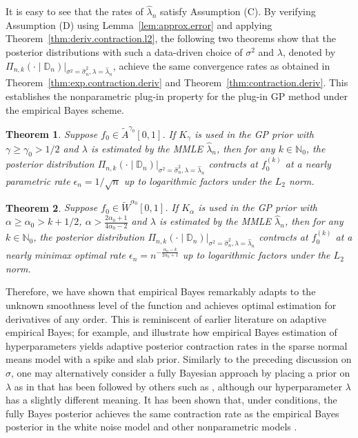 \documentclass[12pt]{article}
\newcommand\data{\mathbb{D}_n}
\theoremstyle{plain}
\newtheorem{theorem}{Theorem}
\theoremstyle{nonitalicremark}
\begin{document}
It is easy to see that the rates of $\hat\lambda_n$ satisfy Assumption (C). By verifying Assumption (D) using Lemma~\ref{lem:approx.error} and applying Theorem~\ref{thm:deriv.contraction.l2}, the following two theorems show that the posterior distributions with such a data-driven choice of $\sigma^2$ and $\lambda$, denoted by $\Pi_{n,k} (\cdot\mid\data)|_{\sigma^2 = \hat \sigma^2_n, \lambda = \hat\lambda_n}$, achieve the same convergence rates as obtained in Theorem~\ref{thm:exp.contraction.deriv} and Theorem~\ref{thm:contraction.deriv}. This establishes the nonparametric plug-in property for the plug-in GP method under the empirical Bayes scheme. 





\begin{theorem}\label{thm:adaptive.exp}
Suppose $f_0\in \widetilde{A}^{\gamma_0}[0,1]$. If $K_\gamma$ is used in the GP prior with $\gamma\geq\gamma_0>1/2$ and $\lambda$ is estimated by the MMLE $\hat\lambda_n$, then for any $k\in\mathbb{N}_0$, the posterior distribution $\Pi_{n,k} (\cdot\mid\data)|_{\sigma^2 = \hat \sigma^2_n, \lambda = \hat\lambda_n}$ contracts at $f_0^{(k)}$ at a nearly parametric rate $\epsilon_n = 1/\sqrt{n}$ up to logarithmic factors under the $L_2$ norm.
\end{theorem}

\begin{theorem}\label{thm:adaptive.poly}
Suppose $f_0 \in \widetilde{W}^{\alpha_0}[0,1]$. If $K_\alpha$ is used in the GP prior with $\alpha \geq \alpha_0 > k+1/2$, $\alpha > \frac{2\alpha_0+1}{4\alpha_0-2}$ and $\lambda$ is estimated by the MMLE $\hat\lambda_n$, then for any $k\in\mathbb{N}_0$, the posterior distribution $\Pi_{n,k} (\cdot\mid\data)|_{\sigma^2 = \hat \sigma^2_n, \lambda = \hat\lambda_n}$ contracts at $f_0^{(k)}$ at a nearly minimax optimal rate $\epsilon_n = n^{-\frac{\alpha_0-k}{2\alpha_0+1}}$ up to logarithmic factors under the $L_2$ norm.
\end{theorem}

Therefore, we have shown that empirical Bayes remarkably adapts to the unknown smoothness level of the function and achieves optimal estimation for derivatives of any order. This is reminiscent of earlier literature on adaptive empirical Bayes; for example, \cite{castillo2018empirical} and \cite{castillo2020spike} illustrate how empirical Bayes estimation of hyperparameters yields adaptive posterior contraction rates in the sparse normal means model with a spike and slab prior. Similarly to the preceding discussion on $\sigma$, one may alternatively consider a fully Bayesian approach by placing a prior on $\lambda$ as in \cite{van2009adaptive} that has been followed by others such as \cite{ bhattacharya2014anisotropic, Li+Ghosal:17}, although our hyperparameter $\lambda$ has a slightly different meaning. It has been shown that, under conditions, the fully Bayes posterior achieves the same contraction rate as the empirical Bayes posterior in the white noise model \citep{szabo2013empirical} and other nonparametric models \citep{rousseau2017asymptotic}.
\end{document}
